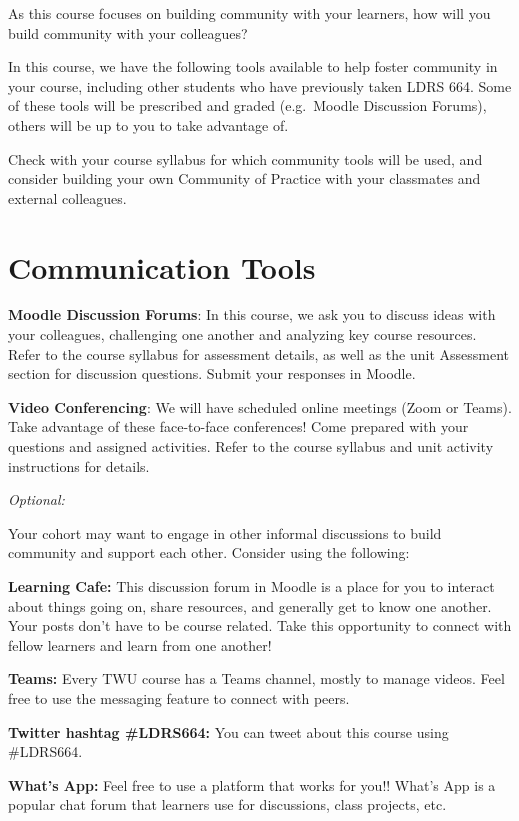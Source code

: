 \documentclass[
]{book}
\begin{document}
As this course focuses on building community with your learners, how will you build community with your colleagues?

In this course, we have the following tools available to help foster community in your course, including other students who have previously taken LDRS 664. Some of these tools will be prescribed and graded (e.g.~Moodle Discussion Forums), others will be up to you to take advantage of.

Check with your course syllabus for which community tools will be used, and consider building your own Community of Practice with your classmates and external colleagues.

\hypertarget{communication-tools}{%
\section{Communication Tools}\label{communication-tools}}

\textbf{Moodle Discussion Forums}: In this course, we ask you to discuss ideas with your colleagues, challenging one another and analyzing key course resources. Refer to the course syllabus for assessment details, as well as the unit Assessment section for discussion questions. Submit your responses in Moodle.

\textbf{Video Conferencing}: We will have scheduled online meetings (Zoom or Teams). Take advantage of these face-to-face conferences! Come prepared with your questions and assigned activities. Refer to the course syllabus and unit activity instructions for details.

\emph{Optional:}

Your cohort may want to engage in other informal discussions to build community and support each other. Consider using the following:

\textbf{Learning Cafe:} This discussion forum in Moodle is a place for you to interact about things going on, share resources, and generally get to know one another. Your posts don't have to be course related. Take this opportunity to connect with fellow learners and learn from one another!

\textbf{Teams:} Every TWU course has a Teams channel, mostly to manage videos. Feel free to use the messaging feature to connect with peers.

\textbf{Twitter hashtag \#LDRS664:} You can tweet about this course using \#LDRS664.

\textbf{What's App:} Feel free to use a platform that works for you!! What's App is a popular chat forum that learners use for discussions, class projects, etc.
\end{document}
